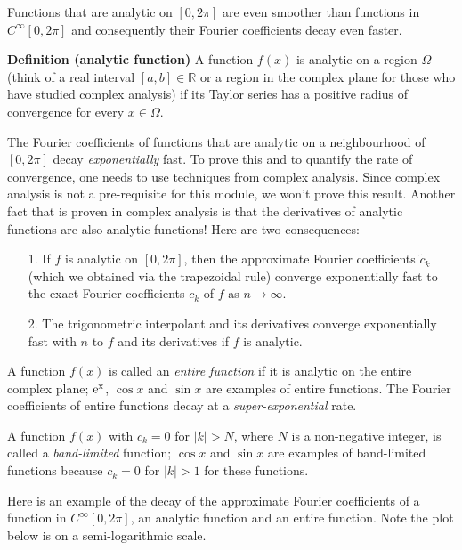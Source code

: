\documentclass[12pt,landscape]{article}
\begin{document}
{Functions that  are analytic on $[0, 2\pi]$ are even smoother than functions in $C^{\infty}[0, 2\pi]$ and consequently their Fourier coefficients decay even faster.

\textbf{Definition (analytic function)} A function $f(x)$ is analytic on a region $\Omega$ (think of a real interval $[a, b] \in \mathbb{R}$ or a region in the complex plane for those who have studied complex analysis) if its Taylor series has a positive radius of convergence for every $x \in \Omega$.

The Fourier coefficients of functions that are analytic on a neighbourhood of $[0, 2\pi]$ decay \emph{exponentially} fast.  To prove this and to quantify the rate of convergence, one needs to use techniques from complex analysis.  Since complex analysis is not a pre-requisite for this module, we won't prove this result.  Another fact that is proven in complex analysis is that the derivatives of analytic functions are also analytic functions! Here are two consequences:

\begin{itemize}
\item[1. ] If $f$ is analytic on $[0, 2\pi]$, then the approximate Fourier coefficients $\widetilde{c}_k$ (which we obtained via the trapezoidal rule) converge exponentially fast to the exact Fourier coefficients $c_k$ of $f$ as $n \to \infty$.   


\item[2. ] The trigonometric interpolant and its derivatives converge exponentially fast with $n$ to $f$ and its derivatives if $f$ is analytic.

\end{itemize}
A function $f(x)$ is called an \emph{entire function} if it is analytic on the entire complex plane; ${\rm e^{x}}$, $\cos x$ and $\sin x$ are examples of entire functions. The Fourier coefficients of entire functions decay at a \emph{super-exponential} rate.

A function $f(x)$ with $c_{k} = 0$ for $\vert k \vert > N$, where $N$ is a non-negative integer, is called a \emph{band-limited} function; $\cos x$ and $\sin x$ are examples of band-limited functions because $c_{k} = 0$ for $\vert k \vert > 1$ for these functions.

Here is an example of the decay of the approximate Fourier coefficients of a function in $C^{\infty}[0, 2\pi]$, an analytic function and an entire function. Note the plot below is on a semi-logarithmic scale.


}
\end{document}
